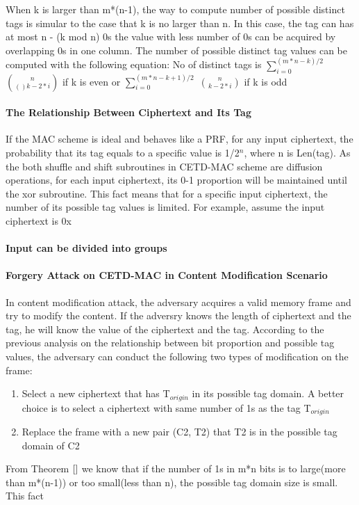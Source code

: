 When k is larger than m*(n-1), the way to compute number of possible distinct tags is simular to the case that k is no larger than n. In this case, the tag can has at most n - (k mod n) 0s the value with less number of 0s can be acquired by overlapping 0s in one column. The number of possible distinct tag values can be computed with the following equation:
No of distinct tags is $\sum_{i=0}^{(m*n-k)/2}$ $\binom{n}{()k-2*i}$ if k is even or $\sum_{i=0}^{(m*n-k+1)/2}$ $\binom{n}{k-2*i}$ if k is odd

\paragraph{The Relationship Between Ciphertext and Its Tag}
If the MAC scheme is ideal and behaves like a PRF, for any input ciphertext, the probability that its tag equals to a specific value is 1/2$^n$, where n is Len(tag). 
As the both shuffle and shift subroutines in CETD-MAC scheme are diffusion operations, for each input ciphertext, its 0-1 proportion will be maintained until the xor subroutine. This fact means that for a specific input ciphertext, the number of its possible tag values is limited. For example, assume the input ciphertext is 0x 
\paragraph{Input can be divided into groups}
\paragraph{Forgery Attack on CETD-MAC in Content Modification Scenario}
In content modification attack, the adversary acquires a valid memory frame and try to modify the content. If the adversry knows the length of ciphertext and the tag, he will know the value of the ciphertext and the tag. According to the previous analysis on the relationship between bit proportion and possible tag values, the adversary can conduct the following two types of modification on the frame:
\begin{enumerate}
	\item Select a new ciphertext that has T$_{origin}$ in its possible tag domain. A better choice is to select a ciphertext with same number of 1s as the tag T$_{origin}$
	\item Replace the frame with a new pair (C2, T2) that T2 is in the possible tag domain of C2
\end{enumerate}
From Theorem $\ref{}$ we know that if the number of 1s in m*n bits is to large(more than m*(n-1)) or too small(less than n), the possible tag domain size is small. This fact 

